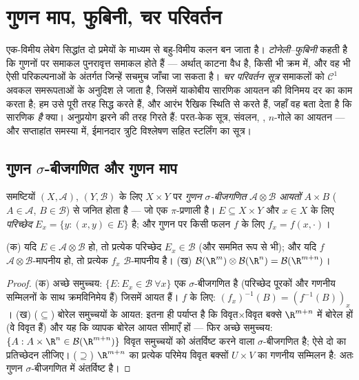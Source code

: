 \chapter{गुणन माप, फुबिनी, चर परिवर्तन}
\label{ch:b3:product}

एक-विमीय लेबेग सिद्धांत दो प्रमेयों के माध्यम से बहु-विमीय कलन बन
जाता है। \emph{टोनेली--फुबिनी} कहती है कि गुणनों पर समाकल
पुनरावृत्त समाकल होते हैं --- अर्थात् काटना वैध है, किसी भी क्रम
में, और वह भी ऐसी परिकल्पनाओं के अंतर्गत जिन्हें सचमुच जाँचा जा
सकता है। \emph{चर परिवर्तन सूत्र} समाकलों को $\mathcal C^1$ अवकल समरूपताओं के
अनुदिश ले जाता है, जिसमें याकोबीय सारणिक आयतन की विनिमय दर का काम
करता है; हम उसे पूरी तरह सिद्ध करते हैं, और आरंभ रैखिक स्थिति से
करते हैं, जहाँ वह बता देता है कि सारणिक \emph{है} क्या। अनुप्रयोग
झरने की तरह गिरते हैं: परत-केक सूत्र, संवलन, ,
$n$-गोले का आयतन --- और सप्ताहांत समस्या में, ईमानदार त्रुटि
विश्लेषण सहित स्टर्लिंग का सूत्र।

\section{गुणन $\sigma$-बीजगणित और गुणन माप}

\begin{definition}\label{def:b3:product:sigma}
 समष्टियों $(X, \mathcal A)$, $(Y, \mathcal B)$ के लिए $X \times
Y$ पर \emph{गुणन
$\sigma$-बीजगणित} $\mathcal A \otimes \mathcal B$ \emph{आयतों} $A \times B$
($A \in
\mathcal A$, $B \in \mathcal B$) से जनित होता है --- जो एक $\pi$-प्रणाली है। $E
\subseteq X\times Y$ और
$x \in X$ के लिए \emph{परिच्छेद} $E_x
= \{y : (x,y) \in E\}$ है; और गुणन पर किसी फलन $f$ के
लिए $f_x = f(x, \cdot)$।
\end{definition}

\begin{proposition}\label{prop:b3:product:sections}
(क) यदि $E \in \mathcal A\otimes\mathcal B$ हो, तो प्रत्येक परिच्छेद $E_x
\in \mathcal B$ (और सममित रूप से भी);
और यदि $f$ $\mathcal
A\otimes\mathcal B$-मापनीय हो, तो प्रत्येक $f_x$ $\mathcal
B$-मापनीय है।
(ख) $\mathcal B(\R^m)\otimes\mathcal B(\R^n) = \mathcal
B(\R^{m+n})$।
\end{proposition}

\begin{proof}
(क) अच्छे समुच्चय: $\{E : E_x \in \mathcal B\ \forall x\}$ एक $\sigma$-बीजगणित है (परिच्छेद पूरकों और
गणनीय सम्मिलनों के साथ क्रमविनिमेय हैं) जिसमें आयत हैं। $f$ के
लिए: $(f_x)^{-1}(B) = (f^{-1}(B))_x$।
(ख) ($\subseteq$) बोरेल समुच्चयों के आयत: इतना ही पर्याप्त है कि
विवृत$\times$विवृत बक्से $\R^{m+n}$ में बोरेल हों (वे विवृत हैं) और यह कि
व्यापक बोरेल आयत सीमाएँ हों --- फिर अच्छे समुच्चय: $\{A : A\times\R^n \in \mathcal B(\R^{m+n})\}$ विवृत
समुच्चयों को अंतर्विष्ट करने वाला $\sigma$-बीजगणित है; ऐसे दो का
प्रतिच्छेदन लीजिए।
($\supseteq$) $\R^{m+n}$ का प्रत्येक  परिमेय विवृत बक्सों $U\times V$ का
गणनीय सम्मिलन है: अतः गुणन $\sigma$-बीजगणित में अंतर्विष्ट है।
\end{proof}

